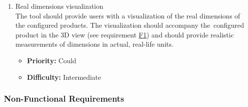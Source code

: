 \begin{enumerate}[label=\textbf{F\arabic*:}, leftmargin=30pt]
\item \label{itm:F21} Real dimensions visualization
\vspace{2pt}
\\The tool should provide users with a visualization of the real dimensions of the configured products. The visualization should accompany the~configured product in the 3D view (see requirement \hyperref[itm:F1]{F1}) and should provide realistic measurements of dimensions in actual, real-life units.
\begin{itemize}[noitemsep, label=\trianglebullet]
    \item \textbf{Priority:} Could
    \item \textbf{Difficulty:} Intermediate
\end{itemize}

\end{enumerate}


\subsubsection{Non-Functional Requirements}

